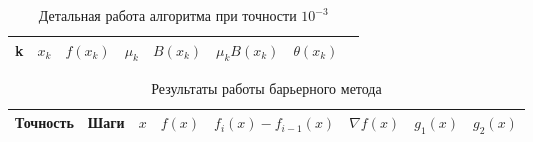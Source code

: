 \documentclass[10pt,a4paper,titlepage]{article}
\begin{document}
\begin{landscape}

\begin{table}[H]
\caption{Детальная работа алгоритма при точности $10^{-3}$}%
\label{bm-detailed-result-table}
\begin{center}
\begin{tabular}{|c|c|c|c|c|c|c|c|}
\hline
k & $x_k$ & $f(x_k)$ & $\mu_k$ & $B(x_k)$ & $\mu_k B(x_k)$ & $\theta(x_k)$ \\
\hline
\hline
\end{tabular}
\end{center}
\end{table}

\begin{table}[H]
\caption{Результаты работы барьерного метода}
\label{bm-result-table}
\begin{center}
\begin{tabular}{|c|c|c|c|c|c|c|c|}
\hline
Точность & Шаги & $x$ & $f(x)$ & $f_i(x) - f_{i - 1}(x)$ & $\nabla f(x)$ & $g_1(x)$ &  $g_2(x)$ \\
\hline
\hline
\end{tabular}
\end{center}
\end{table}

\end{landscape}

\end{document}
